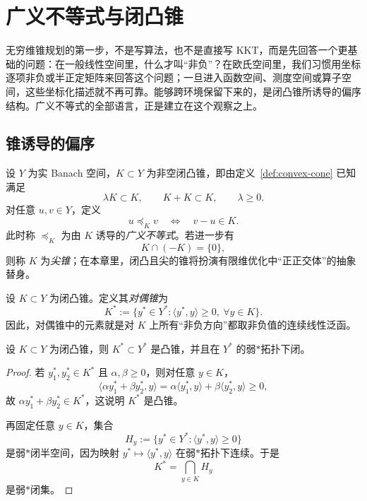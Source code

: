 \section{广义不等式与闭凸锥}

\label{sec:7-1}

无穷维锥规划的第一步，不是写算法，也不是直接写 KKT，而是先回答一个更基础的问题：在一般线性空间里，什么才叫“非负”？在欧氏空间里，我们习惯用坐标逐项非负或半正定矩阵来回答这个问题；一旦进入函数空间、测度空间或算子空间，这些坐标化描述就不再可靠。能够跨环境保留下来的，是闭凸锥所诱导的偏序结构。广义不等式的全部语言，正是建立在这个观察之上。

\subsection{锥诱导的偏序}

\begin{definition}[锥诱导偏序与适当锥]\label{def:cone-induced-order}
设 $Y$ 为实 Banach 空间，$K\subset Y$ 为非空闭凸锥，即由定义~\ref{def:convex-cone} 已知满足
\[
\lambda K\subset K,\qquad K+K\subset K,\qquad \lambda\ge 0.
\]
对任意 $u,v\in Y$，定义
\[
u\preceq_K v \quad \Longleftrightarrow \quad v-u\in K.
\]
此时称 $\preceq_K$ 为由 $K$ 诱导的\emph{广义不等式}。若进一步有
\[
K\cap(-K)=\{0\},
\]
则称 $K$ 为\emph{尖锥}；在本章里，闭凸且尖的锥将扮演有限维优化中“正正交体”的抽象替身。
\end{definition}

\begin{definition}[对偶锥]\label{def:dual-cone}
设 $K\subset Y$ 为闭凸锥。定义其\emph{对偶锥}为
\[
K^\ast:=\{y^\ast\in Y^\ast:\langle y^\ast,y\rangle\ge 0,\ \forall y\in K\}.
\]
因此，对偶锥中的元素就是对 $K$ 上所有“非负方向”都取非负值的连续线性泛函。
\end{definition}

\begin{proposition}[对偶锥仍是闭凸锥]\label{prop:dual-cone-closed-convex}
设 $K\subset Y$ 为闭凸锥，则 $K^\ast\subset Y^\ast$ 是凸锥，并且在 $Y^\ast$ 的弱$\ast$拓扑下闭。
\end{proposition}

\begin{proof}
若 $y_1^\ast,y_2^\ast\in K^\ast$ 且 $\alpha,\beta\ge 0$，则对任意 $y\in K$，
\[
\langle \alpha y_1^\ast+\beta y_2^\ast,y\rangle
=
\alpha\langle y_1^\ast,y\rangle+\beta\langle y_2^\ast,y\rangle\ge 0,
\]
故 $\alpha y_1^\ast+\beta y_2^\ast\in K^\ast$，这说明 $K^\ast$ 是凸锥。

再固定任意 $y\in K$，集合
\[
H_y:=\{y^\ast\in Y^\ast:\langle y^\ast,y\rangle\ge 0\}
\]
是弱$\ast$闭半空间，因为映射 $y^\ast\mapsto \langle y^\ast,y\rangle$ 在弱$\ast$拓扑下连续。于是
\[
K^\ast=\bigcap_{y\in K} H_y
\]
是弱$\ast$闭集。
\end{proof}

